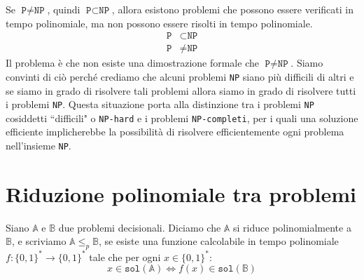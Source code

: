 \begin{tcolorbox}[title = {Congettura $\texttt{P} \neq \texttt{NP}$}]
    Se $\texttt{P} \neq \texttt{NP}$, quindi $\texttt{P} \subset \texttt{NP}$, allora
    esistono problemi che possono essere verificati in tempo polinomiale, ma non possono
    essere risolti in tempo polinomiale.
    \begin{align*}
        \texttt{P} &\subset \texttt{NP} \\
        \texttt{P} &\neq \texttt{NP}
    \end{align*}
    Il problema è che non esiste una dimostrazione formale che 
    $\texttt{P} \neq \texttt{NP}$. Siamo convinti di ciò perché crediamo che alcuni
    problemi \texttt{NP} siano
    più difficili di altri e se siamo in grado di risolvere tali problemi allora 
    siamo in grado di risolvere tutti i problemi \texttt{NP}. Questa situazione
    porta alla distinzione tra i problemi \texttt{NP} cosiddetti ``difficili" o
    \texttt{NP-hard} e i problemi \texttt{NP-completi}, per i quali una soluzione
    efficiente implicherebbe la possibilità di risolvere efficientemente ogni problema
    nell'insieme \texttt{NP}.

\end{tcolorbox}
\begin{figure}[H]
    \centering
\end{figure}
\section{Riduzione polinomiale tra problemi}
\begin{tcolorbox}[title = {Riduzione polinomiale}]
    Siano $\mathbb{A}$ e $\mathbb{B}$ due problemi decisionali. Diciamo che $\mathbb{A}$
    si riduce polinomialmente a $\mathbb{B}$, e scriviamo $\mathbb{A} \leq_p \mathbb{B}$,
    se esiste una funzione calcolabile in tempo polinomiale $f: \{0,1\}^* \rightarrow
    \{0,1\}^*$ tale che per ogni $x \in \{0,1\}^*$:
    \[
        x \in \texttt{sol}(\mathbb{A}) \Leftrightarrow f(x) \in \texttt{sol}(\mathbb{B})
    \]
\end{tcolorbox}